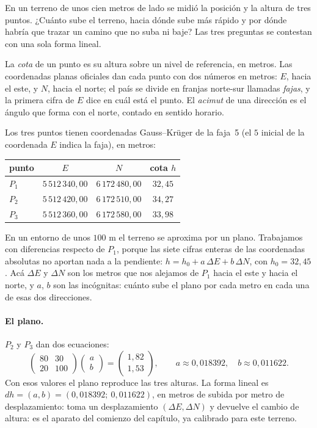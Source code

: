 En un terreno de unos cien metros de lado se midió la posición y la altura de tres puntos. ¿Cuánto
sube el terreno, hacia dónde sube más rápido y por dónde habría que trazar un camino que no
suba ni baje? Las tres preguntas se contestan con una sola forma lineal.

\begin{idea}
La \emph{cota} de un punto es su altura sobre un nivel de referencia, en metros. Las
coordenadas planas oficiales dan cada punto con dos números en metros: \(E\), hacia el este,
y \(N\), hacia el norte; el país se divide en franjas norte-sur llamadas \emph{fajas}, y la
primera cifra de \(E\) dice en cuál está el punto. El \emph{acimut} de una dirección es el
ángulo que forma con el norte, contado en sentido horario.
\end{idea}

Los tres puntos tienen coordenadas Gauss--Krüger de la faja~5 (el \(5\)
inicial de la coordenada \(E\) indica la faja), en metros:
\begin{center}
\begin{tabular}{lccc}
punto & \(E\) & \(N\) & cota \(h\)\\\hline
\(P_1\) & \(5\,512\,340{,}00\) & \(6\,172\,480{,}00\) & \(32{,}45\)\\
\(P_2\) & \(5\,512\,420{,}00\) & \(6\,172\,510{,}00\) & \(34{,}27\)\\
\(P_3\) & \(5\,512\,360{,}00\) & \(6\,172\,580{,}00\) & \(33{,}98\)
\end{tabular}
\end{center}
En un entorno de unos \(100\) m el terreno se aproxima por un plano. Trabajamos con
diferencias respecto de \(P_1\), porque las siete cifras enteras de las coordenadas absolutas
no aportan nada a la pendiente: \(h=h_0+a\,\Delta E+b\,\Delta N\), con \(h_0=32{,}45\). Acá
\(\Delta E\) y \(\Delta N\) son los metros que nos alejamos de \(P_1\) hacia el este y hacia el
norte, y \(a\), \(b\) son las incógnitas: cuánto sube el plano por cada metro en cada una de
esas dos direcciones.

\paragraph{El plano.} \(P_2\) y \(P_3\) dan dos ecuaciones:
\[
  \begin{pmatrix}80&30\\20&100\end{pmatrix}\begin{pmatrix}a\\b\end{pmatrix}
  =\begin{pmatrix}1{,}82\\1{,}53\end{pmatrix},
  \qquad a\approx0{,}018392,\quad b\approx0{,}011622 .
\]
Con esos valores el plano reproduce las tres alturas. La forma lineal es
\(dh=(a,b)=(0{,}018392;\ 0{,}011622)\), en metros de subida por metro de desplazamiento:
toma un desplazamiento \((\Delta E,\Delta N)\) y devuelve el cambio de altura: es el aparato
del comienzo del capítulo, ya calibrado para este terreno.

